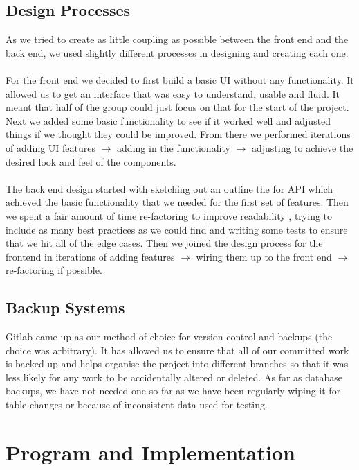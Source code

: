 \documentclass[10pt,a4paper]{article}
\begin{document}
\subsection{Design Processes}

As we tried to create as little coupling as possible between the front end and 
the back end, we used slightly different processes in designing and creating 
each one.  
\\
\\
\noindent For the front end we decided to first build a basic UI without any 
functionality. It allowed us to get an interface that was easy to understand, 
usable and fluid. It meant that half of the group could just focus on that for 
the start of the project. Next we added some basic functionality to see if it 
worked well and adjusted things if we thought they could be improved. From there 
we performed iterations of adding UI features $\rightarrow$ adding in the 
functionality $\rightarrow$ adjusting to achieve the desired look and feel of 
the components.
\\
\\
\noindent The back end design started with sketching out an outline the for API 
which achieved the basic functionality that we needed for the first set of 
features. Then we spent a fair amount of time re-factoring to improve 
readability , trying to include as many best practices as we could find and 
writing some tests to ensure that we hit all of the edge cases. Then we joined 
the design process for the frontend in iterations of adding features 
$\rightarrow$ wiring them up to the front end $\rightarrow$ re-factoring if 
possible.     

\subsection{Backup Systems}

Gitlab came up as our method of choice for version control and backups (the 
choice was arbitrary). It has allowed us to ensure that all of our committed 
work is backed up and helps organise the project into different branches so that it was less 
likely for any work to be accidentally altered or deleted. As far as database backups, 
we have not needed one so far as we have been regularly wiping it for table 
changes or because of inconsistent data used for testing. 

\section{Program and Implementation}
\end{document}
